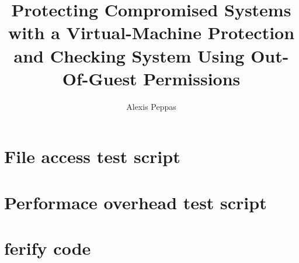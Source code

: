 \documentclass[twoside,thesis]{npsreport}
\title{Protecting Compromised Systems with a Virtual-Machine Protection and Checking System Using Out-Of-Guest Permissions}
\author{Alexis Peppas}
\begin{document}
\NPScover                  %
\NPSsftne                  %
\NPSthesistitle            %
\NPSabstractpage           %
\NPSfrontmatter            %

\renewcommand{\chaptermark}[1]{\markboth{\MakeUppercase{\chaptername}\ \thechapter.\ #1}{}}

%
%
\NPStableOfContents
\NPSlistOfFigures
\NPSlistOfTables
{}

%
%
\NPSexecsummary{%
}

%
%
\NPSacknowledgements{%
}

\NPSbody


%





%
%


%
\NPSappendices
\chapter{File access test script}

\chapter{Performace overhead test script}

\chapter{ferify code}



%
\end{document}
